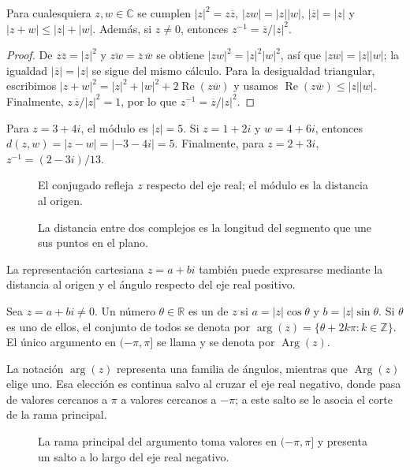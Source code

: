 \begin{proposition}
Para cualesquiera $z,w\in\mathbb{C}$ se cumplen
$|z|^2=z\overline{z}$, $|zw|=|z||w|$, $|\overline{z}|=|z|$ y
$|z+w|\leq |z|+|w|$. Además, si $z\neq0$, entonces
$z^{-1}=\overline{z}/|z|^2$.
\end{proposition}
\begin{proof}
De $z\overline{z}=|z|^2$ y $\overline{zw}=\overline z\,\overline w$ se obtiene
$|zw|^2=|z|^2|w|^2$, así que $|zw|=|z||w|$; la igualdad
$|\overline z|=|z|$ se sigue del mismo cálculo. Para la desigualdad triangular,
escribimos $|z+w|^2=|z|^2+|w|^2+2\operatorname{Re}(z\overline w)$ y usamos
$\operatorname{Re}(z\overline w)\leq|z||w|$. Finalmente,
$z\,\overline z/|z|^2=1$, por lo que $z^{-1}=\overline z/|z|^2$.
\end{proof}
\begin{example}
Para $z=3+4i$, el módulo es $|z|=5$. Si $z=1+2i$ y $w=4+6i$, entonces
$d(z,w)=|z-w|=|-3-4i|=5$. Finalmente, para $z=2+3i$,
$z^{-1}=(2-3i)/13$.
\end{example}
\begin{figure}[htbp]
  \centering
  
  \caption{El conjugado refleja $z$ respecto del eje real; el módulo es la distancia al origen.}
  \label{fig:conjugado-modulo}
\end{figure}
\begin{figure}[htbp]
  \centering
  
  \caption{La distancia entre dos complejos es la longitud del segmento que une sus puntos en el plano.}
  \label{fig:distancia-complejos}
\end{figure}
La representación cartesiana $z=a+bi$ también puede expresarse mediante la distancia al origen y el ángulo respecto del eje real positivo.
\begin{definition}
Sea $z=a+bi\neq0$. Un número $\theta\in\mathbb{R}$ es un 
de $z$ si $a=|z|\cos\theta$ y $b=|z|\sin\theta$. Si $\theta$ es uno de ellos,
el conjunto de todos se denota por
$\arg(z)=\{\theta+2k\pi:k\in\mathbb{Z}\}$. El único argumento en $(-\pi,\pi]$
se llama  y se denota por $\operatorname{Arg}(z)$.
\end{definition}
La notación $\arg(z)$ representa una familia de ángulos, mientras que
$\operatorname{Arg}(z)$ elige uno. Esa elección es continua salvo al cruzar el
eje real negativo, donde pasa de valores cercanos a $\pi$ a valores cercanos a
$-\pi$; a este salto se le asocia el corte de la rama principal.
\begin{figure}[htbp]
  \centering
  
  \caption{La rama principal del argumento toma valores en $(-\pi,\pi]$ y presenta un salto a lo largo del eje real negativo.}
  \label{fig:argumento-principal}
\end{figure}
